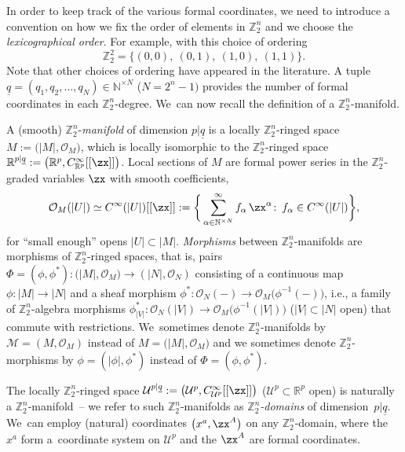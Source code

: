 \documentclass[pdftex]{sigma}%
\newcommand{\R}{{\mathbb R}}
\newcommand{\Z}{{\mathbb Z}}
\def\ul{\underline}
\def\cO{\mathcal{O}}
\def\ul{\underline}
\newcommand{\0}{\otimes}
\newcommand{\z}{\Z_2^n}
\numberwithin{equation}{section}
\begin{document}
In order to keep track of the various formal coordinates, we need to introduce a convention on how we fix the order of elements in $\Z_{2}^{n}$ and we choose the \emph{lexicographical order}. For example, with this choice of ordering
\[
\Z_{2}^{2} = \{ (0,0), \: (0,1), \: (1,0), \: (1,1)\}.
\]
Note that other choices of ordering have appeared in the literature. A tuple $\ul{q} = (q_{1}, q_{2}, \dots , q_{N})\in\mathbb{N}^{\times N}$ ($N = 2^{n}-1)$ provides the number of formal coordinates in each $\z$-degree. We~can now recall the definition of a $\Z_2^n$-manifold.
%
\begin{Definition}\label{def:Z2nMan}
A (smooth) $\Z_{2}^{n}$-\emph{manifold} of dimension $p |\ul{q}$ is a locally $\Z_{2}^{n}$-ringed space $ M := \big(|M|, \cO_M \big)$, which is locally isomorphic to the $\Z_{2}^{n}$-ringed space $\mathbb{R}^{p |\ul{q}} := \big( \mathbb{R}^{p}, C^{\infty}_{\mathbb{R}^{p}}[[\zx]] \big)$. Local sections of $M$ are formal power series in the $\Z_{2}^{n}$-graded variables $\zx$ with smooth coefficients,
\[
\cO_M(|U|) \simeq C^{\infty}(|U|)[[\zx]] := \bigg \{ \sum_{\alpha \in \mathbb{N}^{\times N}}^{\infty} f_{\alpha}\,\zx^{\alpha}\colon \, f_{\alpha} \in C^{\infty}(|U|)\bigg \},
\]
for ``small enough'' opens $|U|\subset |M|$. \emph{Morphisms} between $\Z_{2}^{n}$-manifolds are morphisms of $\Z_{2}^{n}$-ringed spaces, that is, pairs $\Phi = (\phi, \phi^{*}) \colon \big(|M|, \cO_M\big) \rightarrow (|N|, \cO_N)$ consisting of a continuous map $\phi\colon |M| \rightarrow |N|$ and a sheaf morphism $\phi^{*} \colon \cO_N(-) \rightarrow \cO_M\big(\phi^{-1}(-)\big)$, i.e., a family of $\Z_2^n$-algebra morphisms $\phi^*_{|V|}\colon \cO_N(|V|) \rightarrow \cO_M\big(\phi^{-1}(|V|)\big)$ ($|V| \subset |N|$ open) that commute with restrictions. We~sometimes denote $\z$-manifolds by $\mathcal{M}=(M,\cO_M)$ instead of $M = \big(|M|, \cO_M \big)$ and we sometimes denote $\z$-morphisms by $\phi=(|\phi|,\phi^*)$ instead of $\Phi = (\phi, \phi^{*})$. \end{Definition}

\begin{Example}%
The locally $\Z_{2}^{n}$-ringed space $\mathcal{U}^{p|\ul{q}} := \big(\mathcal{U}^p , C^\infty_{\mathcal{U}^p}[[\zx]] \big)$ ($\mathcal{U}^p \subset \R^p$ open) is naturally a $\Z_2^n$-manifold~-- we refer to such $\Z_2^n$-manifolds as \emph{$\Z_2^n$-domains} of dimension~$p|\ul{q}$. We~can employ (natural) coordinates $\big(x^a, \zx^A\big)$ on any $\Z_2^n$-domain, where the $x^a$ form a~coordinate system on $\mathcal{U}^p$ and the $\zx^A$ are formal coordinates.
\end{Example}
\end{document}
